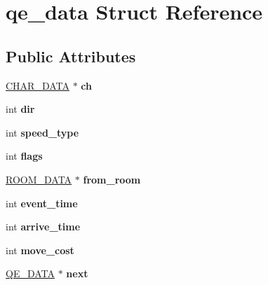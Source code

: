 \hypertarget{structqe__data}{\section{qe\-\_\-data Struct Reference}
\label{structqe__data}
}
\subsection*{Public Attributes}
\begin{DoxyCompactItemize}
\item 
\hypertarget{structqe__data_a74bace48d10399a7e59335bfc4e25464}{\hyperlink{structchar__data}{C\-H\-A\-R\-\_\-\-D\-A\-T\-A} $\ast$ {\bfseries ch}}\label{structqe__data_a74bace48d10399a7e59335bfc4e25464}

\item 
\hypertarget{structqe__data_a8412f8dbe6b830f79005efe3cfc61ef4}{int {\bfseries dir}}\label{structqe__data_a8412f8dbe6b830f79005efe3cfc61ef4}

\item 
\hypertarget{structqe__data_aa070f528c6714b8ab013d256144affa0}{int {\bfseries speed\-\_\-type}}\label{structqe__data_aa070f528c6714b8ab013d256144affa0}

\item 
\hypertarget{structqe__data_a2584860e1b67ff2a3e390be354807d8a}{int {\bfseries flags}}\label{structqe__data_a2584860e1b67ff2a3e390be354807d8a}

\item 
\hypertarget{structqe__data_a16f8afbea646659a38b342114635b05b}{\hyperlink{structroom__data}{R\-O\-O\-M\-\_\-\-D\-A\-T\-A} $\ast$ {\bfseries from\-\_\-room}}\label{structqe__data_a16f8afbea646659a38b342114635b05b}

\item 
\hypertarget{structqe__data_ab42b52d33fe67d2a75ab2f3a7fe1aa31}{int {\bfseries event\-\_\-time}}\label{structqe__data_ab42b52d33fe67d2a75ab2f3a7fe1aa31}

\item 
\hypertarget{structqe__data_a4b0ea6cfe38ebf3f6c9d4056fb8812e1}{int {\bfseries arrive\-\_\-time}}\label{structqe__data_a4b0ea6cfe38ebf3f6c9d4056fb8812e1}

\item 
\hypertarget{structqe__data_aa0fa1722c4952fd1842d8efd58fd799c}{int {\bfseries move\-\_\-cost}}\label{structqe__data_aa0fa1722c4952fd1842d8efd58fd799c}

\item 
\hypertarget{structqe__data_a6d7a520f4b25f891db6dbecbf27de2c3}{\hyperlink{structqe__data}{Q\-E\-\_\-\-D\-A\-T\-A} $\ast$ {\bfseries next}}\label{structqe__data_a6d7a520f4b25f891db6dbecbf27de2c3}


\end{DoxyCompactItemize}

